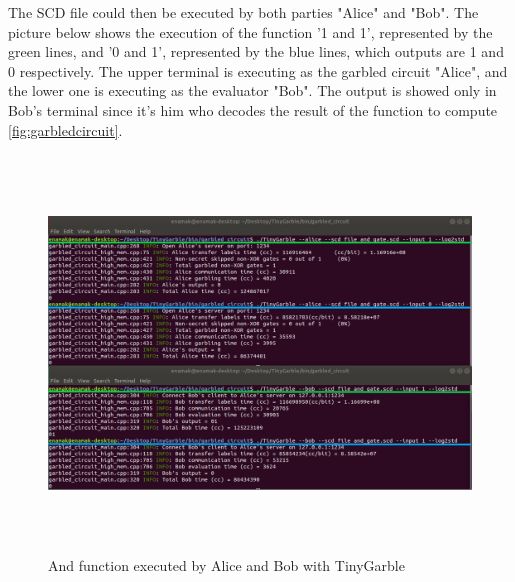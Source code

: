 \begin{refsection}
The SCD file could then be executed by both parties "Alice" and "Bob".
The picture below shows the execution of the function '1 and 1', represented by the green lines, and '0 and 1', represented by the blue lines, which outputs are 1 and 0 respectively. The upper terminal is executing as the garbled circuit "Alice", and the lower one is executing as the evaluator "Bob". The output is showed only in Bob's terminal since it's him who decodes the result of the function to compute \ref{fig:garbledcircuit}.

\begin{figure}[H]
	\centering
	\includegraphics[width=1\textwidth, height=10.5cm]{./sdf/secure_multiparty_computation/figures/tinygarble_terminal.png}
    \caption{And function executed by Alice and Bob with TinyGarble}\label{fig:tinygarble_terminal}
\end{figure}

\clearpage
\printbibliography[heading=subbibliography]
\end{refsection}
\cleardoublepage
